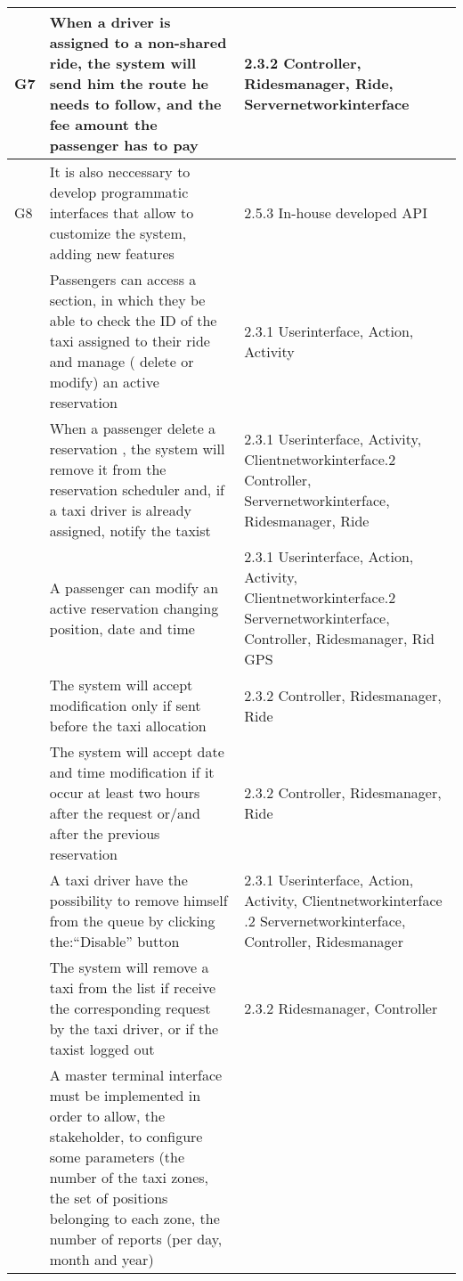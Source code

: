 \begin{center}
\begin{longtable}{| m{2cm} | m{6cm} | m{5cm} | }
    G7&When a driver is assigned to a non-shared ride, the system will send him the route he needs to follow, and the fee
	amount the passenger has to pay& 2.3.2 Controller, Ridesmanager, Ride, Servernetworkinterface \\ \hline
    G8& It is also neccessary to develop programmatic interfaces that allow to customize the system, adding new features& 2.5.3 In-house developed API\\ \hline
      & Passengers can access a section, in which they be able to check the ID of the taxi assigned to their ride 
	and manage ( delete or modify) an active reservation&  2.3.1 Userinterface, Action, Activity\\ \hline
      & When a passenger delete a reservation , the system will remove it from the reservation scheduler and, if a taxi 
	driver is already assigned, notify the taxist& 2.3.1 Userinterface, Activity, Clientnetworkinterface\newline
							2.3.2 Controller, Servernetworkinterface, Ridesmanager, Ride\\ \hline
      & A passenger can modify an active reservation changing position, date and time& 2.3.1 Userinterface, Action, Activity, Clientnetworkinterface\newline
											2.3.2 Servernetworkinterface, Controller, Ridesmanager, Rid \newline
											2.1 GPS\\ \hline
      & The system will accept modification only if sent before the taxi allocation&2.3.2 Controller, Ridesmanager, Ride \\ \hline
      & The system will accept date and time modification if it occur at least two hours after the request or/and after the 
	previous reservation& 2.3.2 Controller, Ridesmanager, Ride\\ \hline
      & A taxi driver have the possibility to remove himself from the queue by clicking the:``Disable'' button& 2.3.1 Userinterface, Action, Activity, Clientnetworkinterface \newline
														 2.3.2 Servernetworkinterface, Controller, Ridesmanager\\ \hline
      & The system will remove a taxi from the list if receive the corresponding request by the taxi driver, or if the taxist logged out& 2.3.2 Ridesmanager, Controller\\ \hline
      &  A master terminal interface must be implemented in order to allow, the stakeholder, to configure some parameters 
	 (the number of the taxi zones, the set of positions belonging to each zone, the number of reports (per day, month and year)

\end{longtable}
\end{center}
